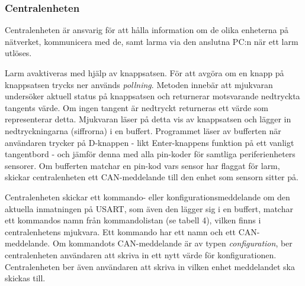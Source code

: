 \subsubsection{Centralenheten}

Centralenheten är ansvarig för att hålla information om de olika enheterna på nätverket, kommunicera med de, samt larma via den anslutna PC:n när ett larm utlöses.

Larm avaktiveras med hjälp av knappsatsen. För att avgöra om en knapp på knappsatsen trycks ner används \textit{pollning}. Metoden innebär att mjukvaran undersöker aktuell status på knappsatsen och returnerar motsvarande nedtryckta tangents värde. Om ingen tangent är nedtryckt returneras ett värde som representerar detta.
Mjukvaran läser på detta vis av knappsatsen och lägger in nedtryckningarna (siffrorna) i en buffert.
Programmet läser av bufferten när användaren trycker på D-knappen - likt Enter-knappens funktion på ett vanligt tangentbord - och jämför denna med alla pin-koder för samtliga periferienheters sensorer.
Om bufferten matchar en pin-kod vars sensor har flaggat för larm, skickar centralenheten ett CAN-meddelande till den enhet som sensorn sitter på.

Centralenheten skickar ett kommando- eller konfigurationsmeddelande om den aktuella inmatningen på USART, som även den lägger sig i en buffert, matchar ett kommandos namn
från kommandolistan (se tabell 4), vilken finns i centralenhetens mjukvara. Ett kommando har ett namn och ett CAN-meddelande. Om kommandots CAN-meddelande är av typen \textit{configuration}, ber centralenheten
användaren att skriva in ett nytt värde för konfigurationen. Centralenheten ber även användaren att skriva in vilken enhet meddelandet ska skickas till.

\begin{table}[h]
\caption{Lista över kommandon som användaren kan skriva in i USART.}
\end{table}

